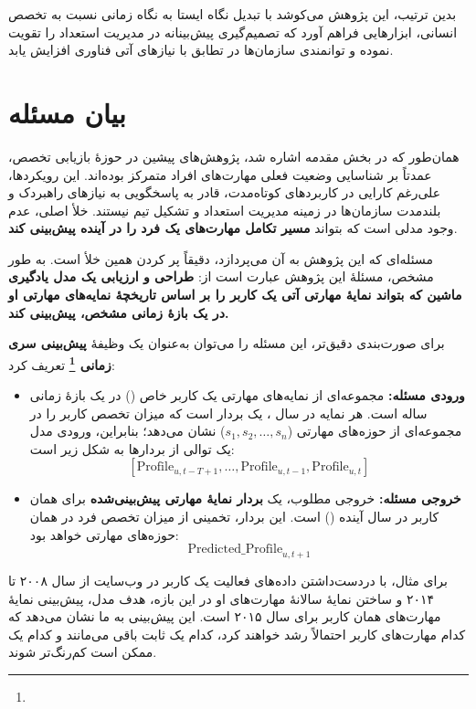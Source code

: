 بدین ترتیب، این پژوهش می‌کوشد با تبدیل نگاه ایستا به نگاه زمانی نسبت به تخصص انسانی، ابزارهایی فراهم آورد که تصمیم‌گیری پیش‌بینانه در مدیریت استعداد را تقویت نموده و توانمندی سازمان‌ها در تطابق با نیازهای آتی فناوری افزایش یابد.


\section{بیان مسئله}

همان‌طور که در بخش مقدمه اشاره شد، پژوهش‌های پیشین در حوزهٔ بازیابی تخصص، عمدتاً بر شناسایی وضعیت فعلی مهارت‌های افراد متمرکز بوده‌اند. این رویکردها، علی‌رغم کارایی در کاربردهای کوتاه‌مدت، قادر به پاسخگویی به نیازهای راهبردک و بلندمدت سازمان‌ها در زمینه مدیریت استعداد و تشکیل تیم نیستند. خلأ اصلی، عدم وجود مدلی است که بتواند \textbf{مسیر تکامل مهارت‌های یک فرد را در آینده پیش‌بینی کند}.

مسئله‌ای که این پژوهش به آن می‌پردازد، دقیقاً پر کردن همین خلأ است. به طور مشخص، مسئلهٔ این پژوهش عبارت است از:
\textbf{طراحی و ارزیابی یک مدل یادگیری ماشین که بتواند نمایهٔ مهارتی آتی یک کاربر را بر اساس تاریخچهٔ نمایه‌های مهارتی او در یک بازهٔ زمانی مشخص، پیش‌بینی کند.}

برای صورت‌بندی دقیق‌تر، این مسئله را می‌توان به‌عنوان یک وظیفهٔ \textbf{پیش‌بینی سری زمانی \footnote{}} تعریف کرد:

\begin{itemize}
    \item \textbf{ورودی مسئله:}
    مجموعه‌ای از نمایه‌های مهارتی یک کاربر خاص () در یک بازهٔ زمانی  ساله است. هر نمایه در سال ، یک بردار است که میزان تخصص کاربر را در مجموعه‌ای از حوزه‌های مهارتی ($s_1, s_2, \dots, s_n$) نشان می‌دهد؛ بنابراین، ورودی مدل یک توالی از بردارها به شکل زیر است:
    \[
        [\mathrm{Profile}_{u, t-T+1}, \dots, \mathrm{Profile}_{u, t-1}, \mathrm{Profile}_{u, t}]
    \]

    \item \textbf{خروجی مسئله:}
    خروجی مطلوب، یک \textbf{بردار نمایهٔ مهارتی پیش‌بینی‌شده} برای همان کاربر در سال آینده () است. این بردار، تخمینی از میزان تخصص فرد در همان حوزه‌های مهارتی خواهد بود:
    \[
        \mathrm{Predicted\_Profile}_{u, t+1}
    \]
\end{itemize}

برای مثال، با دردست‌داشتن داده‌های فعالیت یک کاربر در وب‌سایت  از سال ۲۰۰۸ تا ۲۰۱۴ و ساختن نمایهٔ سالانهٔ مهارت‌های او در این بازه، هدف مدل، پیش‌بینی نمایهٔ مهارت‌های همان کاربر برای سال ۲۰۱۵ است. این پیش‌بینی به ما نشان می‌دهد که کدام مهارت‌های کاربر احتمالاً رشد خواهند کرد، کدام یک ثابت باقی می‌مانند و کدام یک ممکن است کم‌رنگ‌تر شوند.

